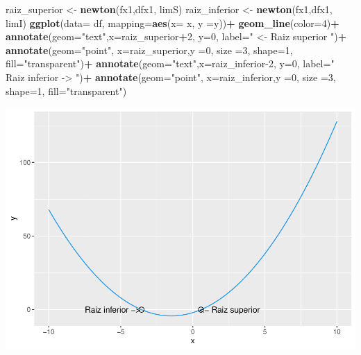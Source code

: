 \documentclass[11pt,]{article}
\newenvironment{Shaded}{\begin{snugshade}}{\end{snugshade}}
\newcommand{\DataTypeTok}[1]{\textcolor[rgb]{0.13,0.29,0.53}{#1}}
\newcommand{\DecValTok}[1]{\textcolor[rgb]{0.00,0.00,0.81}{#1}}
\newcommand{\KeywordTok}[1]{\textcolor[rgb]{0.13,0.29,0.53}{\textbf{#1}}}
\newcommand{\NormalTok}[1]{#1}
\newcommand{\OperatorTok}[1]{\textcolor[rgb]{0.81,0.36,0.00}{\textbf{#1}}}
\newcommand{\StringTok}[1]{\textcolor[rgb]{0.31,0.60,0.02}{#1}}
\begin{document}
\begin{Shaded}
\begin{Highlighting}[]
\NormalTok{raiz_superior <-}\StringTok{ }\KeywordTok{newton}\NormalTok{(fx1,dfx1, limS)}
\NormalTok{raiz_inferior <-}\StringTok{ }\KeywordTok{newton}\NormalTok{(fx1,dfx1, limI)}
\KeywordTok{ggplot}\NormalTok{(}\DataTypeTok{data=}\NormalTok{ df, }\DataTypeTok{mapping=}\KeywordTok{aes}\NormalTok{(}\DataTypeTok{x=}\NormalTok{ x, }\DataTypeTok{y =}\NormalTok{y))}\OperatorTok{+}
\StringTok{  }\KeywordTok{geom_line}\NormalTok{(}\DataTypeTok{color=}\DecValTok{4}\NormalTok{)}\OperatorTok{+}
\StringTok{  }\KeywordTok{annotate}\NormalTok{(}\DataTypeTok{geom=}\StringTok{"text"}\NormalTok{,}\DataTypeTok{x=}\NormalTok{raiz_superior}\OperatorTok{+}\DecValTok{2}\NormalTok{, }\DataTypeTok{y=}\DecValTok{0}\NormalTok{, }\DataTypeTok{label=}\StringTok{" <- Raiz superior "}\NormalTok{)}\OperatorTok{+}
\StringTok{  }\KeywordTok{annotate}\NormalTok{(}\DataTypeTok{geom=}\StringTok{"point"}\NormalTok{, }\DataTypeTok{x=}\NormalTok{raiz_superior,}\DataTypeTok{y =}\DecValTok{0}\NormalTok{, }\DataTypeTok{size =}\DecValTok{3}\NormalTok{, }\DataTypeTok{shape=}\DecValTok{1}\NormalTok{, }\DataTypeTok{fill=}\StringTok{"transparent"}\NormalTok{)}\OperatorTok{+}
\StringTok{  }\KeywordTok{annotate}\NormalTok{(}\DataTypeTok{geom=}\StringTok{"text"}\NormalTok{,}\DataTypeTok{x=}\NormalTok{raiz_inferior}\DecValTok{-2}\NormalTok{, }\DataTypeTok{y=}\DecValTok{0}\NormalTok{, }\DataTypeTok{label=}\StringTok{" Raiz inferior -> "}\NormalTok{)}\OperatorTok{+}
\StringTok{  }\KeywordTok{annotate}\NormalTok{(}\DataTypeTok{geom=}\StringTok{"point"}\NormalTok{, }\DataTypeTok{x=}\NormalTok{raiz_inferior,}\DataTypeTok{y =}\DecValTok{0}\NormalTok{, }\DataTypeTok{size =}\DecValTok{3}\NormalTok{, }\DataTypeTok{shape=}\DecValTok{1}\NormalTok{, }\DataTypeTok{fill=}\StringTok{"transparent"}\NormalTok{)}
\end{Highlighting}
\end{Shaded}

\includegraphics{Newton_raphson_files/figure-latex/unnamed-chunk-5-1.pdf}

\newpage
\singlespacing 
\end{document}
